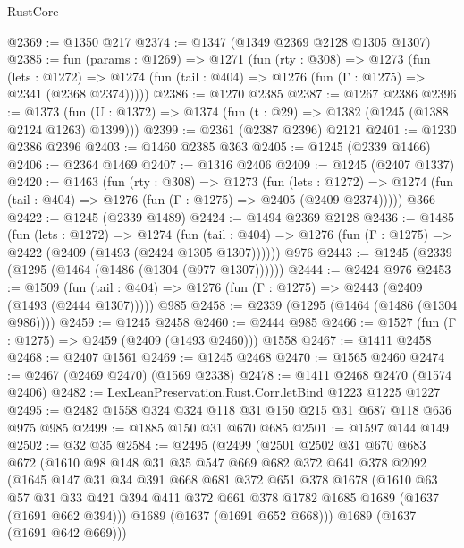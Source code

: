 \begin{lexlean}{RustCore}
\begin{coremodule}
@2369 := @1350 @217
@2374 := @1347 (@1349 @2369 @2128 @1305 @1307)
@2385 := fun (params : @1269) =>
  @1271
    (fun (rty : @308) =>
    @1273
      (fun (lets : @1272) =>
      @1274 (fun (tail : @404) => @1276 (fun (Γ : @1275) => @2341 (@2368 @2374)))))
@2386 := @1270 @2385
@2387 := @1267 @2386
@2396 := @1373 (fun (U : @1372) => @1374 (fun (t : @29) => @1382 (@1245 (@1388 @2124 @1263) @1399)))
@2399 := @2361 (@2387 @2396) @2121
@2401 := @1230 @2386 @2396
@2403 := @1460 @2385 @363
@2405 := @1245 (@2339 @1466)
@2406 := @2364 @1469
@2407 := @1316 @2406
@2409 := @1245 (@2407 @1337)
@2420 := @1463
    (fun (rty : @308) =>
    @1273
      (fun (lets : @1272) =>
      @1274 (fun (tail : @404) => @1276 (fun (Γ : @1275) => @2405 (@2409 @2374)))))
    @366
@2422 := @1245 (@2339 @1489)
@2424 := @1494 @2369 @2128
@2436 := @1485
    (fun (lets : @1272) =>
    @1274
      (fun (tail : @404) => @1276 (fun (Γ : @1275) => @2422 (@2409 (@1493 (@2424 @1305 @1307))))))
    @976
@2443 := @1245 (@2339 (@1295 (@1464 (@1486 (@1304 (@977 @1307))))))
@2444 := @2424 @976
@2453 := @1509
    (fun (tail : @404) => @1276 (fun (Γ : @1275) => @2443 (@2409 (@1493 (@2444 @1307)))))
    @985
@2458 := @2339 (@1295 (@1464 (@1486 (@1304 @986))))
@2459 := @1245 @2458
@2460 := @2444 @985
@2466 := @1527 (fun (Γ : @1275) => @2459 (@2409 (@1493 @2460))) @1558
@2467 := @1411 @2458
@2468 := @2407 @1561
@2469 := @1245 @2468
@2470 := @1565 @2460
@2474 := @2467 (@2469 @2470) (@1569 @2338)
@2478 := @1411 @2468 @2470 (@1574 @2406)
@2482 := LexLeanPreservation.Rust.Corr.letBind @1223 @1225 @1227
@2495 := @2482 @1558 @324 @324 @118 @31 @150 @215 @31 @687 @118 @636 @975 @985
@2499 := @1885 @150 @31 @670 @685
@2501 := @1597 @144 @149
@2502 := @32 @35
@2584 := @2495
    (@2499
      (@2501
        @2502
        @31
        @670
        @683
        @672
        (@1610
          @98
          @148
          @31
          @35
          @547
          @669
          @682
          @372
          @641
          @378
          @2092
          (@1645
            @147
            @31
            @34
            @391
            @668
            @681
            @372
            @651
            @378
            @1678
            (@1610
              @63
              @57
              @31
              @33
              @421
              @394
              @411
              @372
              @661
              @378
              @1782
              @1685
              @1689
              (@1637 (@1691 @662 @394)))
            @1689
            (@1637 (@1691 @652 @668)))
          @1689
          (@1637 (@1691 @642 @669)))

\end{coremodule}
\end{lexlean}
